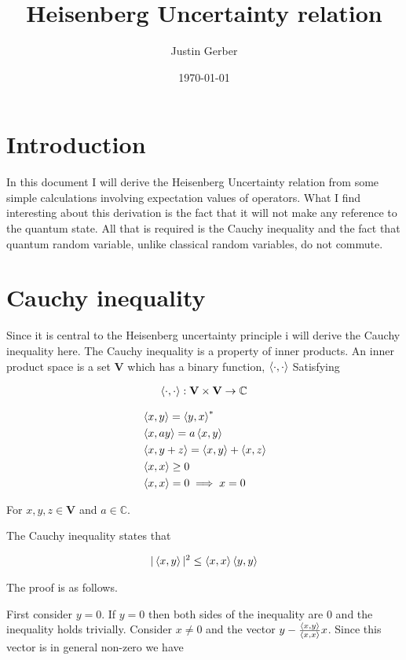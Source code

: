 \documentclass[12pt]{article}
\newcommand{\bv}[1]{\textbf{#1}}
\begin{document}
\title{Heisenberg Uncertainty relation}
\author{Justin Gerber}
\date{\today}
\maketitle

\section{Introduction}

In this document I will derive the Heisenberg Uncertainty relation from some simple calculations involving expectation values of operators. What I find interesting about this derivation is the fact that it will not make any reference to the quantum state. All that is required is the Cauchy inequality and the fact that quantum random variable, unlike classical random variables, do not commute.

\section{Cauchy inequality}

Since it is central to the Heisenberg uncertainty principle i will derive the Cauchy inequality here. The Cauchy inequality is a property of inner products. An inner product space is a set $\bv{V}$ which has a binary function, $\Braket{\cdot,\cdot}$ Satisfying

\begin{align}
\Braket{\cdot,\cdot}: \bv{V} \times \bv{V} \rightarrow \mathbb{C}
\end{align}

\begin{align}
&\Braket{x,y} = \Braket{y,x}^*\\
&\Braket{x,ay} = a \Braket{x,y}\\
&\Braket{x,y+z} = \Braket{x,y} + \Braket{x,z}\\
&\Braket{x,x} \ge 0\\
&\Braket{x,x} = 0 \implies x = 0
\end{align}

For $x,y,z \in \bv{V}$ and $a \in \mathbb{C}$.

The Cauchy inequality states that

\begin{align}
|\Braket{x,y}|^2 \le \Braket{x,x} \Braket{y,y}
\end{align}

The proof is as follows.

First consider $y=0$. If $y=0$ then both sides of the inequality are 0 and the inequality holds trivially.
Consider $x \neq 0$ and the vector $y - \frac{\Braket{x,y}}{\Braket{x,x}}x$. Since this vector is in general non-zero we have
\end{document}
